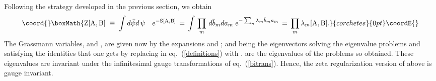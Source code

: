 \documentclass[a4paper,12pt]{article}
\def\A{{\rm A}}
\def\B{{\rm B}}
\def\Z{{\rm Z}}
\begin{document}
Following the strategy developed in the previous section, we obtain
\begin{displaymath}\coord{}\boxMath{
\Z[\A, \B] \;\equiv\;\int  d\bar{\psi}d\,\psi\quad e^{-{\rm S}[\A,\B]}\,=\,
\int\,\prod_{m}\,d{\bar b}_m da_m\; e^{-\sum_{n}\lambda_m {\bar b}_m a_m}\,=\,
\prod_{m}\lambda_m[\A,\B].
}{corchetes}{0pt}\coordE{}\end{displaymath}
The Grassmann variables, \coordHE{} and \coordHE{}, are given now by
the expansions \coordHE{} and \coordHE{}; \coordHE{} and \coordHE{} being the eigenvectors solving 
the eigenvalue problems and satisfying the identities that one gets by  replacing in eq.~(\ref{definitions}) \myHighlight{$i\hat{D}(\A)$}\coordHE{}  with \myHighlight{$i\hat{D}(\A,\B)$}\coordHE{}. 
\myHighlight{$\lambda_m^2[\A,\B]$}\coordHE{} are the eigenvalues of the problems so obtained. These 
eigenvalues are invariant under the infinitesimal gauge transformations of eq.~(\ref{bitrans}). Hence, the zeta 
regularization version of \myHighlight{$\Z[\A, \B]$}\coordHE{} above is gauge invariant.
\end{document}
